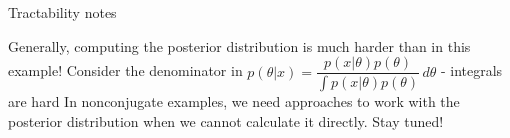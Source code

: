 \documentclass[10pt]{beamer}
\begin{document}

\begin{frame}{Tractability notes}

Generally, computing the posterior distribution is much harder than in this example!
\vfill
Consider the denominator in $ p(\theta | x) = \dfrac{p(x | \theta) p(\theta)}{\int p(x | \theta) p(\theta)} \, d\theta $  - integrals are hard 
\vfill
In nonconjugate examples, we need approaches to work with the posterior distribution when we cannot calculate it directly. Stay tuned!

\end{frame}







\end{document}
